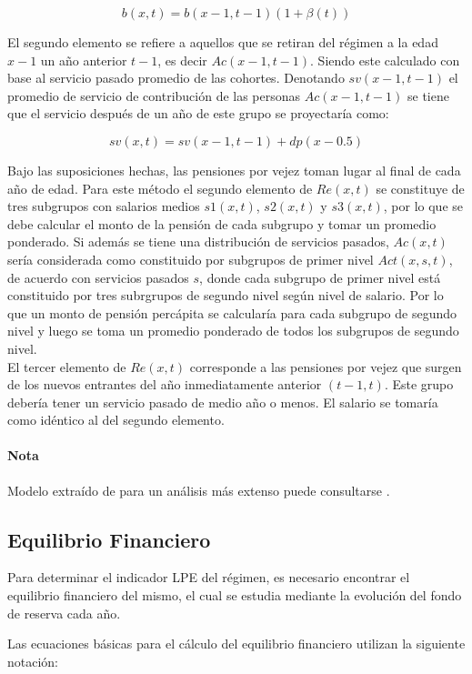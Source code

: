 \documentclass[12pt,letterpaper,titlepage]{article}
\begin{document}
{\[ b(x,t)=b(x-1,t-1)(1+\beta(t)) \]

El segundo elemento se refiere a aquellos que se retiran del régimen a la edad $x-1$ un año anterior $t-1$, es decir $Ac(x-1,t-1)$. Siendo este calculado con base al servicio pasado promedio de las cohortes. Denotando $sv(x-1,t-1)$ el promedio de servicio de contribución de las personas $Ac(x-1,t-1)$ se tiene que el servicio después de un año de este grupo se proyectaría como:

\[ sv(x,t)=sv(x-1,t-1)+dp(x-0.5) \]

Bajo las suposiciones hechas, las pensiones por vejez toman lugar al final de cada año de edad. Para este método el segundo elemento de $Re(x,t)$ se constituye de tres subgrupos con salarios medios $s1(x,t)$, $s2(x,t)$ y $s3(x,t)$, por lo que se debe calcular el monto de la pensión de cada subgrupo y tomar un promedio ponderado. Si además se tiene una distribución de servicios pasados, $Ac(x,t)$ sería considerada como constituido por subgrupos de primer nivel $Act(x,s,t)$, de acuerdo con servicios pasados $s$, donde cada subgrupo de primer nivel está constituido por tres subrgrupos de segundo nivel según nivel de salario. Por lo que un monto de pensión percápita se calcularía para cada subgrupo de segundo nivel y luego se toma un promedio ponderado de todos los subgrupos de segundo nivel. \\

El tercer elemento de $Re(x,t)$ corresponde a las pensiones por vejez que surgen de los nuevos entrantes del año inmediatamente anterior $(t-1,t)$. Este grupo debería tener un servicio pasado de medio año o menos. El salario se tomaría como idéntico al del segundo elemento.

\paragraph{Nota}Modelo extraído de \cite{amssp} para un análisis más extenso puede consultarse \cite{apss}.


\subsection{Equilibrio Financiero}

Para determinar el indicador LPE del régimen, es necesario encontrar el equilibrio financiero del mismo, el cual se estudia mediante la evolución del fondo de reserva cada año. 

Las ecuaciones básicas para el cálculo del equilibrio financiero utilizan la siguiente notación:

}
\end{document}
